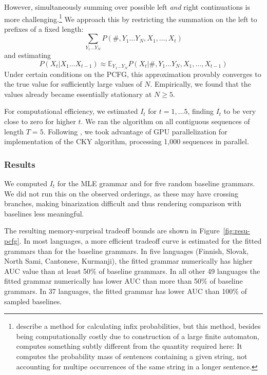\documentclass[11pt,letterpaper]{article}
\newcommand{\E}[0]{\mathbb{E}}
\begin{document}
However, simultaneously summing over possible left \emph{and} right continuations is more challenging.\footnote{\citet{DBLP:conf/emnlp/NederhofS11} describe a method for calculating infix probabilities, but this method, besides being computationally costly due to construction of a large finite automaton, computes something subtly different from the quantity required here: It computes the probability mass of sentences containing a given string, not accounting for multipe occurrences of the same string in a longer sentence.}
We approach this by restricting the summation on the left to prefixes of a fixed length:
\begin{equation}
    \sum_{Y_1\dots Y_N} P(\#, Y_1 \dots Y_N, X_1, \dots, X_t)
\end{equation}
and estimating
\begin{equation}
    P(X_t|X_1\dots X_{t-1}) \approx \E_{Y_1\dots Y_N} P(X_t|\#, Y_1 \dots Y_N, X_1, \dots, X_{t-1})
\end{equation}
Under certain conditions on the PCFG, this approximation provably converges to the true value for sufficiently large values of $N$.
Empirically, we found that the values already became essentially stationary at $N\geq 5$.

For computational efficiency, we estimated $I_t$ for $t=1, \dots 5$, finding $I_t$ to be very close to zero for higher $t$.
We ran the algorithm on all contiguous sequences of length $T=5$.
Following \cite{DBLP:conf/acl/KimDR19}, we took advantage of GPU parallelization for implementation of the CKY algorithm, processing 1,000 sequences in parallel.


\subsubsection{Results}
We computed $I_t$ for the MLE grammar and for five random baseline grammars.
We did not run this on the observed orderings, as these may have crossing branches, making binarization difficult and thus rendering comparison with baselines less meaningful.

The resulting memory-surprisal tradeoff bounds are shown in Figure~\ref{fig:resu-pcfg}.
In most languages, a more efficient tradeoff curve is estimated for the fitted grammars than for the baseline grammars.
In five languages (Finnish, Slovak, North Sami, Cantonese, Kurmanji), the fitted grammar numerically has higher AUC value than at least 50\% of baseline grammars.
In all other 49 languages the fitted grammar numerically has lower AUC than more than 50\% of baseline grammars.
In 37 languages, the fitted grammar has lower AUC than 100\% of sampled baselines.
\end{document}
